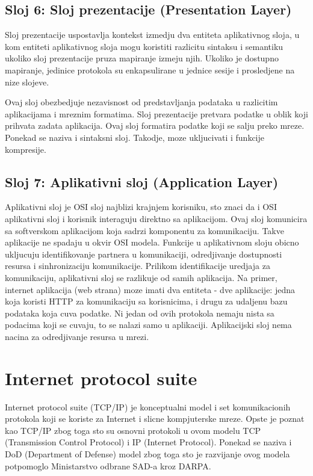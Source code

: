\documentclass[a4paper,12pt, master]{etf}
\begin{document}
	\subsection{Sloj 6: Sloj prezentacije (Presentation Layer)}

	Sloj prezentacije uspostavlja kontekst izmedju dva entiteta aplikativnog sloja, u kom 
	entiteti aplikativnog sloja mogu koristiti razlicitu sintaksu i semantiku ukoliko sloj 
	prezentacije pruza mapiranje izmeju njih. Ukoliko je dostupno mapiranje, jedinice 
	protokola su enkapsulirane u jednice sesije i prosledjene na nize slojeve.

	Ovaj sloj obezbedjuje nezavisnost od predstavljanja podataka u razlicitim aplikacijama i
	mreznim formatima. Sloj prezentacije pretvara podatke u oblik koji prihvata zadata 
	aplikacija.	Ovaj sloj formatira podatke koji se salju preko mreze. Ponekad se naziva i 
	sintaksni sloj.	Takodje, moze ukljucivati i funkcije kompresije.

	\subsection{Sloj 7: Aplikativni sloj (Application Layer)}

	Aplikativni sloj je OSI sloj najblizi krajnjem korisniku, sto znaci da i OSI aplikativni 
	sloj i korisnik interaguju direktno sa aplikacijom. Ovaj sloj komunicira sa softverskom 
	aplikacijom	koja sadrzi komponentu za komunikaciju. Takve aplikacije ne spadaju u okvir 
	OSI modela.	Funkcije u aplikativnom sloju obicno ukljucuju identifikovanje partnera u 
	komunikaciji, odredjivanje dostupnosti resursa i sinhronizaciju komunikacije. Prilikom 
	identifikacije uredjaja za komunikaciju, aplikativni sloj se razlikuje od samih 
	aplikacija. Na primer, internet aplikacija (web strana) moze imati dva entiteta - dve 
	aplikacije: jedna koja koristi HTTP za komunikaciju sa korisnicima, i drugu za udaljenu 
	bazu podataka koja cuva podatke. Ni jedan od ovih protokola nemaju nista sa podacima koji 
	se cuvaju, to se nalazi samo u aplikaciji. Aplikacijski sloj nema nacina za odredjivanje 
	resursa u mrezi.

	\section{Internet protocol suite}
	
	Internet protocol suite (TCP/IP) je konceptualni model i set komunikacionih protokola koji se 
	koriste za Internet i slicne kompjuterske mreze. Opste je poznat kao TCP/IP zbog toga sto 
	su osnovni protokoli u ovom modelu TCP (Transmission Control Protocol) i IP (Internet 
	Protocol). Ponekad se naziva i DoD (Department of Defense) model zbog toga sto je 
	razvijanje ovog modela potpomoglo Ministarstvo odbrane SAD-a kroz DARPA.
\end{document}
